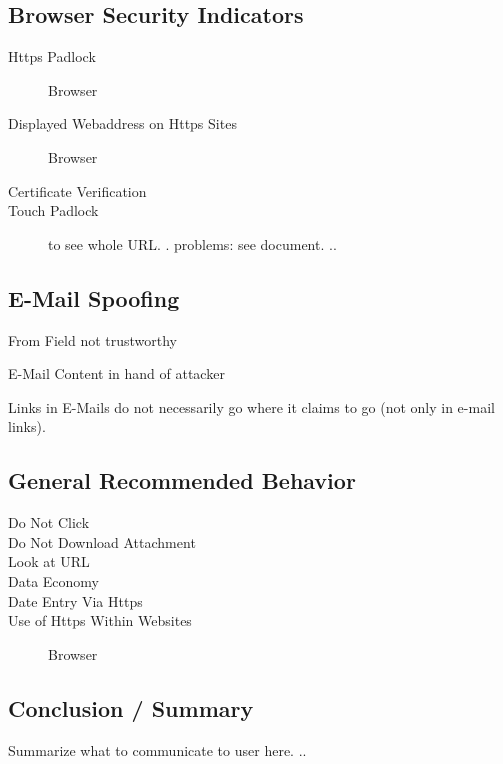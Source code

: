 \subsection{Browser Security Indicators}

\begin{description}
		\item[Https Padlock] Browser
		\item[Displayed Webaddress on Https Sites] Browser
		\item[Certificate Verification]
		\item[Touch Padlock] to see whole URL.
. problems: see document.
..
\end{description}

\subsection{E-Mail Spoofing}

\begin{description}
	\item{From Field} not trustworthy
	\item{E-Mail Content} in hand of attacker
	\item{Links in E-Mails} do not necessarily go where it claims to go (not only in e-mail links).
\end{description}

\subsection{General Recommended Behavior}
\begin{description}
	\item[Do Not Click]
	\item[Do Not Download Attachment]
	\item[Look at URL]
	\item[Data Economy]
	\item[Date Entry Via Https]
	\item[Use of Https Within Websites] Browser
\end{description}

\subsection{Conclusion / Summary}

Summarize what to communicate to user here.
..

